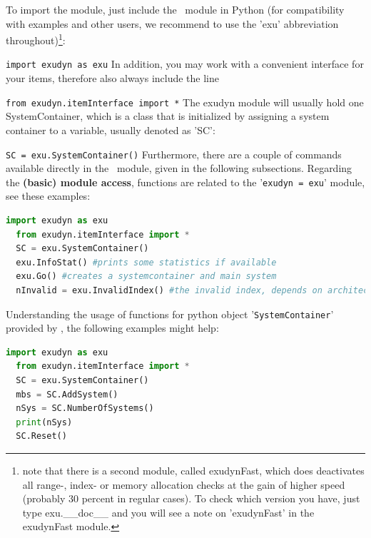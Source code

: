 \documentclass[11pt,a4paper]{book} %
\begin{document}
To import the module, just include the \codeName\ module in Python (for compatibility with examples and other users, we recommend to use the 'exu' abbreviation throughout)\footnote{note that there is a second module, called exudynFast, which does deactivates all range-, index- or memory allocation checks at the gain of higher speed (probably 30 percent in regular cases). To check which version you have, just type exu.\_\_doc\_\_ and you will see a note on 'exudynFast' in the exudynFast module.}:
\bi
  \item[] \texttt{import exudyn as exu}
\ei
In addition, you may work with a convenient interface for your items, therefore also always include the line
\bi
  \item[] \texttt{from exudyn.itemInterface import *}
\ei
The exudyn module will usually hold one SystemContainer, which is a class that is initialized by assigning a system container to a variable, usually denoted as 'SC':
\bi
  \item[] \texttt{SC = exu.SystemContainer()}
\ei
Furthermore, there are a couple of commands available directly in the \codeName\ module, given in the following subsections.
Regarding the {\bf (basic) module access}, functions are related to the '\texttt{exudyn = exu}' module, see these examples:
\begin{lstlisting}[language=Python, firstnumber=14]
  import exudyn as exu
  from exudyn.itemInterface import *
  SC = exu.SystemContainer()
  exu.InfoStat() #prints some statistics if available
  exu.Go() #creates a systemcontainer and main system
  nInvalid = exu.InvalidIndex() #the invalid index, depends on architecture and version
\end{lstlisting} \vspace{12pt}
%
Understanding the usage of functions for python object '\texttt{SystemContainer}' provided by \codeName, the following examples might help:
\begin{lstlisting}[language=Python, firstnumber=14]
  import exudyn as exu
  from exudyn.itemInterface import *
  SC = exu.SystemContainer()
  mbs = SC.AddSystem()
  nSys = SC.NumberOfSystems()
  print(nSys)
  SC.Reset()
\end{lstlisting} \vspace{12pt}
%
\end{document}
